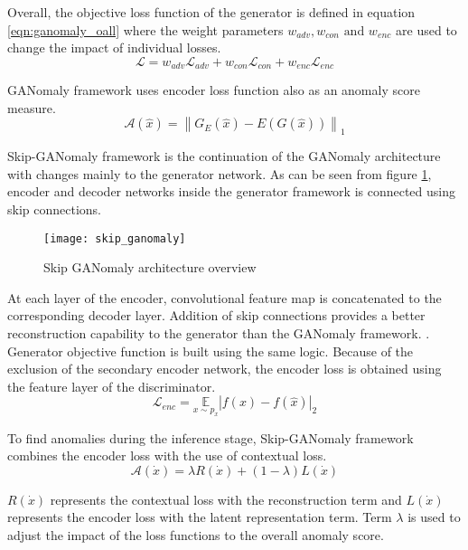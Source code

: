 Overall, the objective loss function of the generator is defined in equation
\ref{eqn:ganomaly_oall} where the weight parameters $w_{adv}, w_{con} \text { and } w_{enc}$
are used to change the impact of individual losses.
\begin{equation}
    \label{eqn:ganomaly_oall}
    \mathcal{L}=w_{a d v} \mathcal{L}_{a d v}+w_{c o n} \mathcal{L}_{c o n}+w_{e n c} \mathcal{L}_{e n c} 
\end{equation}

GANomaly framework uses encoder loss function also as an anomaly score measure.  
\begin{equation}
    \mathcal{A}(\hat{x})=\left\|G_{E}(\hat{x})-E(G(\hat{x}))\right\|_{1}  
\end{equation}

Skip-GANomaly framework\cite{Akay2019SkipGANomalySC} is the continuation of the GANomaly architecture with changes mainly to the
generator network. As can be seen from figure \ref{fig:sganomaly_model}, encoder and decoder
networks inside the generator framework is connected using skip connections. 
\begin{figure}[h!]
	\centering
	\texttt{[image: skip\_ganomaly]}
    \caption{Skip GANomaly architecture overview \cite{Akay2019SkipGANomalySC}}
    \label{fig:sganomaly_model}
\end{figure}

At each layer of the encoder, convolutional feature map is concatenated to the corresponding decoder
layer. Addition of skip connections provides a better reconstruction capability to the generator
than the GANomaly framework. \cite{Akay2018GANomalySA}. Generator objective function is built using
the same logic. Because of the exclusion of the secondary encoder network, the encoder loss is
obtained using the feature layer of the discriminator. 
\begin{equation}
    \mathcal{L}_{enc}=\underset{x \sim p_{x}}{\mathbb{E}}|f(x)-f(\hat{x})|_{2}  
\end{equation}

To find anomalies during the inference stage, Skip-GANomaly framework combines the encoder loss with
the use of contextual loss. 
\begin{equation}
    \mathcal{A}(\dot{x})=\lambda R(\dot{x})+(1-\lambda) L(\dot{x})  
\end{equation}

$R(\dot{x})$ represents the contextual loss with the reconstruction term and $L(\dot{x})$ represents
the encoder loss with the latent representation term. Term $\lambda$ is used to adjust the impact of
the loss functions to the overall anomaly score.

